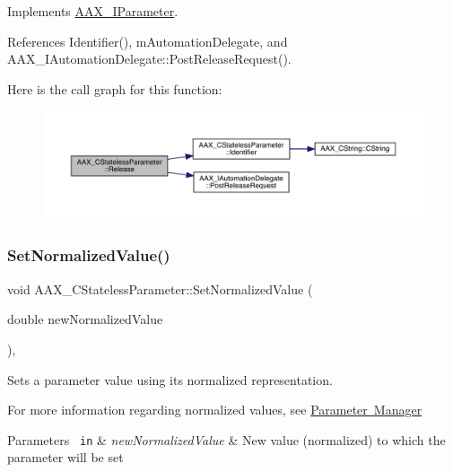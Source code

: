 Implements \mbox{\hyperlink{a01857_a3d4869d9b6ec03d4f95f33f56479756f}{A\+A\+X\+\_\+\+I\+Parameter}}.



References Identifier(), m\+Automation\+Delegate, and A\+A\+X\+\_\+\+I\+Automation\+Delegate\+::\+Post\+Release\+Request().

Here is the call graph for this function\+:
\nopagebreak
\begin{figure}[H]
\begin{center}
\leavevmode
\includegraphics[width=350pt]{a01541_a815f21974e1a75eb9fdcc5cf3e0704c4_cgraph}
\end{center}
\end{figure}
\mbox{\label{a01541_a921a21bd3a68cdcf6c9d5903f3d18dd6}} 
\subsubsection{\texorpdfstring{SetNormalizedValue()}{SetNormalizedValue()}}
{\footnotesize\ttfamily void A\+A\+X\+\_\+\+C\+Stateless\+Parameter\+::\+Set\+Normalized\+Value (\begin{DoxyParamCaption}\item[{double}]{new\+Normalized\+Value }\end{DoxyParamCaption})\hspace{0.3cm}{\ttfamily [inline]}, {\ttfamily [virtual]}}



Sets a parameter value using it\textquotesingle{}s normalized representation. 

For more information regarding normalized values, see \mbox{\hyperlink{a00814}{Parameter Manager}}


\begin{DoxyParams}[1]{Parameters}
\mbox{\texttt{ in}}  & {\em new\+Normalized\+Value} & New value (normalized) to which the parameter will be set \\
\hline
\end{DoxyParams}


